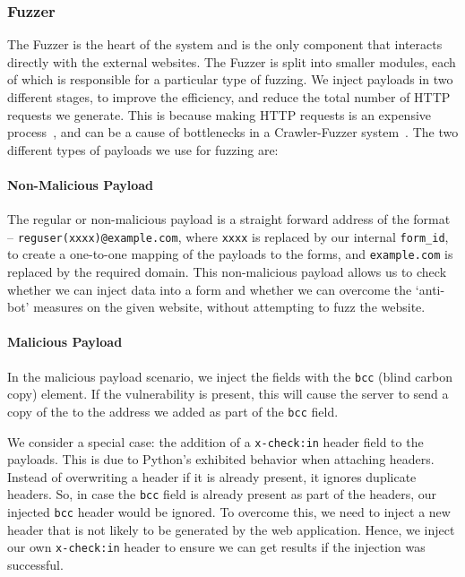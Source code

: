 \subsubsection{Fuzzer}
\label{Comp:Fuzzer}
The Fuzzer is the heart of the system and is the only component that interacts directly with the external websites. The Fuzzer is split into smaller modules, each of which is responsible for a particular type of fuzzing.  We inject payloads in two different stages, to improve the efficiency, and reduce the total number of HTTP requests we generate. This is because making HTTP requests is an expensive process~\cite{McGrath2009}, and can be a cause of bottlenecks in a Crawler-Fuzzer system~\cite{ShkapenyukTorstenSuel2001}.
The two different types of payloads we use for fuzzing are:
\paragraph{Non-Malicious Payload}
\label{Comp:Fuzzer:nmp}
The regular or non-malicious payload is a straight forward \Email address of the format -- \texttt{reguser(xxxx)@example.com}, where \texttt{xxxx} is replaced by our internal \texttt{form\_id}, to create a one-to-one mapping of the payloads to the forms, and \texttt{example.com} is replaced by the required domain.
This non-malicious payload allows us to check whether we can inject data into a form and whether we can overcome the `anti-bot' measures on the given website, without attempting to fuzz the website.

\paragraph{Malicious Payload}
\label{Comp:Fuzzer:mp}
In the malicious payload scenario, we inject the fields with the \texttt{bcc} (blind carbon copy) element. If the vulnerability is present, this will cause the server to send a copy of the \email to the \email address we added as part of the \texttt{bcc} field.

We consider a special case: the addition of a \texttt{x-check:in} header field to the payloads. This is due to Python's exhibited behavior when attaching
headers. Instead of overwriting a header if it is already present, it ignores duplicate headers. So, in case the \texttt{bcc} field is already present as part of the headers, our injected \texttt{bcc} header would be ignored. To overcome this, we need to inject a new header that is not likely to be generated by the web application. Hence, we inject our own \texttt{x-check:in} header to ensure we can get results if the injection was successful.

